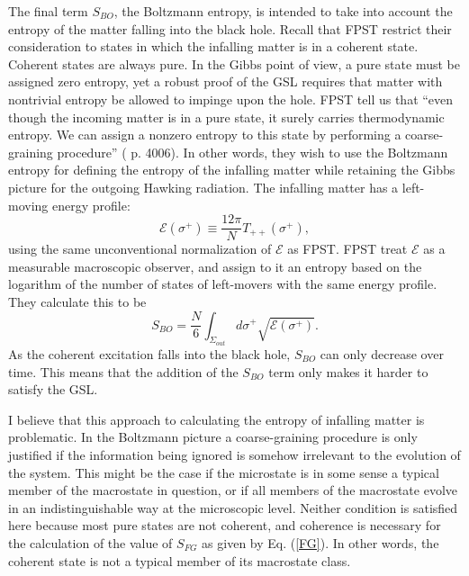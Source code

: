 \documentclass[12pt]{article}
\begin{document}
The final term $S_{BO}$, the Boltzmann entropy, is intended to take into account the entropy of the matter falling into the black hole.  Recall that FPST restrict their consideration to states in which the infalling matter is in a coherent state.  Coherent states are always pure.  In the Gibbs point of view, a pure state must be assigned zero entropy, yet a robust proof of the GSL requires that matter with nontrivial entropy be allowed to impinge upon the hole.  FPST tell us that ``even though the incoming matter is in a pure state, it surely carries thermodynamic entropy.  We can assign a nonzero entropy to this state by performing a coarse-graining procedure'' (\cite{fiola94} p. 4006).  In other words, they wish to use the Boltzmann entropy for defining the entropy of the infalling matter while retaining the Gibbs picture for the outgoing Hawking radiation.  The infalling matter has a left-moving energy profile:
\begin{equation}
\mathcal{E}(\sigma^{+}) \equiv \frac{12\pi}{N} T_{++}(\sigma^{+}),
\end{equation}
using the same unconventional normalization of $\mathcal{E}$ as FPST.  FPST treat $\mathcal{E}$ as a measurable macroscopic observer, and assign to it an entropy based on the logarithm of the number of states of left-movers with the same energy profile.  They calculate this to be
\begin{equation}\label{BO}
S_{BO} = \frac{N}{6} \int_{\Sigma_{out}} d\sigma^{+} \sqrt{\mathcal{E}(\sigma^{+})}.
\end{equation}
As the coherent excitation falls into the black hole, $S_{BO}$ can only decrease over time.  This means that the addition of the $S_{BO}$ term only makes it harder to satisfy the GSL.

I believe that this approach to calculating the entropy of infalling matter is problematic.  In the Boltzmann picture a coarse-graining procedure is only justified if the information being ignored is somehow irrelevant to the evolution of the system.  This might be the case if the microstate is in some sense a typical member of the macrostate in question, or if all members of the macrostate evolve in an indistinguishable way at the microscopic level.  Neither condition is satisfied here because most pure states are not coherent, and coherence is necessary for the calculation of the value of $S_{FG}$ as given by Eq. (\ref{FG}).  In other words, the coherent state is not a typical member of its macrostate class.
\end{document}
